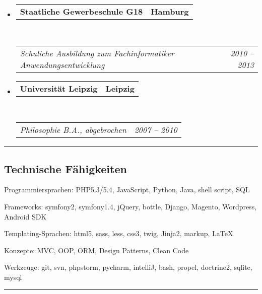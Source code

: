 \documentclass[10pt,letterpaper]{article}
\makeatletter
\newenvironment{indentsection}[1]%
{\begin{list}{}%
	{\setlength{\leftmargin}{#1}}%
	\item[]%
}
{\end{list}}
\newcommand{\headerrow}[2]
{\begin{tabular*}{\linewidth}{l@{\extracolsep{\fill}}r}
	#1 &
	#2 \\
\end{tabular*}}
\makeatother
\begin{document}
\begin{itemize}
	\parskip=0.1em

	\item 
	\headerrow
		{\textbf{Staatliche Gewerbeschule G18}}
		{\textbf{Hamburg}}
	\\
	\headerrow
		{\emph{Schuliche Ausbildung zum Fachinformatiker Anwendungsentwicklung}}
		{\emph{2010 -- 2013}}
	
	
	\item 
  	\headerrow
		  {\textbf{Universität Leipzig}}
		  {\textbf{Leipzig}}
	\\
	\headerrow
		{\emph{Philosophie B.A., abgebrochen}}
		{\emph{2007 -- 2010}}
\end{itemize}

\hrule
\vspace{-0.4em}
\subsection*{Technische Fähigkeiten}

\begin{indentsection}{\parindent}
\begin{description*}
	\item[Programmiersprachen:]
    PHP5.3/5.4, JavaScript, Python, Java, shell script, SQL
	\item[Frameworks:]
	  symfony2, symfony1.4, jQuery, bottle, Django, Magento, Wordpress, Android SDK
	\item[Templating-Sprachen:]
	  html5, sass, less, css3, twig, Jinja2, markup, \LaTeX
	\item[Konzepte:]
	  MVC, OOP, ORM, Design Patterns, Clean Code
  \item[Werkzeuge:]
    git, svn, phpstorm, pycharm, intelliJ, bash, propel, doctrine2, sqlite, mysql
\end{description*}
\end{indentsection}



\hrule
\vspace{-0.4em}
\end{document}
